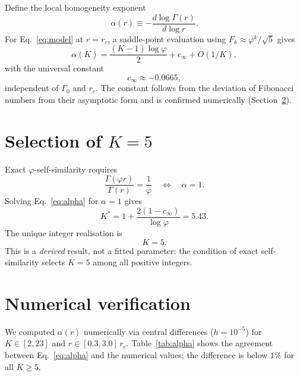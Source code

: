 \documentclass[twocolumn,aps,prfluids]{revtex4-2}
\newcommand{\phig}{\varphi}
\newcommand{\Gam}{\Gamma}
\begin{document}
Define the local homogeneity exponent
\begin{equation}
\alpha(r) \equiv -\frac{d\log\Gam(r)}{d\log r}.
\end{equation}
For Eq.~\eqref{eq:model} at $r = r_c$, a saddle-point evaluation using
$F_k \approx \phig^k/\sqrt{5}$ gives
\begin{equation}
\alpha(K) = \frac{(K-1)\log\phig}{2} + c_\infty + O(1/K),
\label{eq:alpha}
\end{equation}
with the universal constant
\begin{equation}
c_\infty \approx -0.0665,
\end{equation}
independent of $\Gam_0$ and $r_c$. The constant follows from the deviation
of Fibonacci numbers from their asymptotic form and is confirmed
numerically (Section~\ref{sec:num}).

\section{Selection of $K=5$}
\label{sec:Kstar}

Exact $\phig$-self-similarity requires
\begin{equation}
\frac{\Gam(\phig r)}{\Gam(r)} = \frac{1}{\phig}
\quad\Longleftrightarrow\quad
\alpha = 1.
\end{equation}
Solving Eq.~\eqref{eq:alpha} for $\alpha=1$ gives
\begin{equation}
K^* = 1 + \frac{2(1 - c_\infty)}{\log\phig} = 5.43.
\end{equation}
The unique integer realisation is
\begin{equation}
\boxed{K = 5.}
\end{equation}
This is a \emph{derived} result, not a fitted parameter: the condition
of exact self-similarity selects $K=5$ among all positive integers.

\section{Numerical verification}
\label{sec:num}

We computed $\alpha(r)$ numerically via central differences
($h = 10^{-5}$) for $K \in [2, 23]$ and $r \in [0.3, 3.0]\,r_c$.
Table~\ref{tab:alpha} shows the agreement between Eq.~\eqref{eq:alpha}
and the numerical values; the difference is below $1\%$ for all $K \geq 5$.
\end{document}
